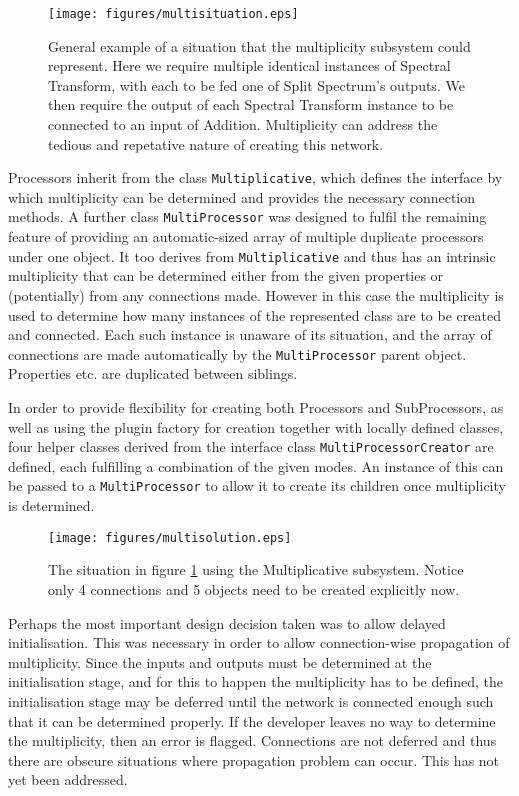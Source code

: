 \begin{figure}[ht!]
\centering
\texttt{[image: figures/multisituation.eps]}
\caption{General example of a situation that the multiplicity subsystem could represent. Here we require multiple identical instances of Spectral Transform, with each to be fed one of Split Spectrum's outputs. We then require the output of each Spectral Transform instance to be connected to an input of Addition. Multiplicity can address the tedious and repetative nature of creating this network.}
\label{fig:multisituation}
\end{figure}

Processors inherit from the class \texttt{Multiplicative}, which defines the interface by which multiplicity can be determined and provides the necessary connection methods. A further class \texttt{MultiProcessor} was designed to fulfil the remaining feature of providing an automatic-sized array of multiple duplicate processors under one object. It too derives from \texttt{Multiplicative} and thus has an intrinsic multiplicity that can be determined either from the given properties or (potentially) from any connections made. However in this case the multiplicity is used to determine how many instances of the represented class are to be created and connected. Each such instance is unaware of its situation, and the array of connections are made automatically by the \texttt{MultiProcessor} parent object. Properties etc. are duplicated between siblings.

In order to provide flexibility for creating both Processors and SubProcessors, as well as using the plugin factory for creation together with locally defined classes, four helper classes derived from the interface class \texttt{MultiProcessorCreator} are defined, each fulfilling a combination of the given modes. An instance of this can be passed to a \texttt{MultiProcessor} to allow it to create its children once multiplicity is determined.

\begin{figure}[ht!]
\centering
\texttt{[image: figures/multisolution.eps]}
\caption{The situation in figure \ref{fig:multisituation} using the Multiplicative subsystem. Notice only 4 connections and 5 objects need to be created explicitly now.}
\label{fig:multisolution}
\end{figure}

Perhaps the most important design decision taken was to allow delayed initialisation. This was necessary in order to allow connection-wise propagation of multiplicity. Since the inputs and outputs must be determined at the initialisation stage, and for this to happen the multiplicity has to be defined, the initialisation stage may be deferred until the network is connected enough such that it can be determined properly. If the developer leaves no way to determine the multiplicity, then an error is flagged. Connections are not deferred and thus there are obscure situations where propagation problem can occur. This has not yet been addressed.

